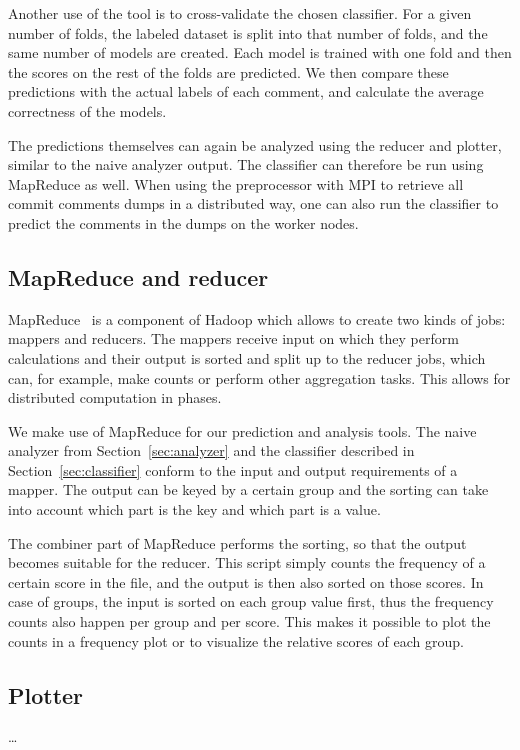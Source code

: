 \documentclass{article}
\begin{document}
Another use of the tool is to cross-validate the chosen classifier. For a given 
number of folds, the labeled dataset is split into that number of folds, and 
the same number of models are created. Each model is trained with one fold and 
then the scores on the rest of the folds are predicted. We then compare these 
predictions with the actual labels of each comment, and calculate the average 
correctness of the models.

The predictions themselves can again be analyzed using the reducer and plotter, 
similar to the naive analyzer output. The classifier can therefore be run using 
MapReduce as well. When using the preprocessor with MPI to retrieve all commit 
comments dumps in a distributed way, one can also run the classifier to predict
the comments in the dumps on the worker nodes.

\subsection{MapReduce and reducer}\label{sec:reducer}
MapReduce~\cite{mapreduce} is a component of Hadoop which allows to create two
kinds of jobs: mappers and reducers. The mappers receive input on which they
perform calculations and their output is sorted and split up to the reducer jobs,
which can, for example, make counts or perform other aggregation tasks. This
allows for distributed computation in phases.

We make use of MapReduce for our prediction and analysis tools. The naive 
analyzer from Section~\ref{sec:analyzer} and the classifier described in 
Section~\ref{sec:classifier} conform to the input and output requirements of 
a mapper. The output can be keyed by a certain group and the sorting can take 
into account which part is the key and which part is a value.

The combiner part of MapReduce performs the sorting, so that the output becomes 
suitable for the reducer. This script simply counts the frequency of a certain 
score in the file, and the output is then also sorted on those scores. In case 
of groups, the input is sorted on each group value first, thus the frequency
counts also happen per group and per score. This makes it possible to plot the
counts in a frequency plot or to visualize the relative scores of each group.

\subsection{Plotter}\label{sec:plotter}
\ldots
\end{document}
